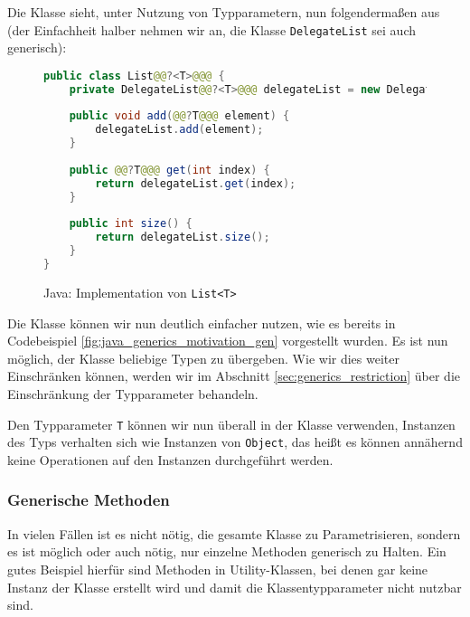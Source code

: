 		Die Klasse sieht, unter Nutzung von Typparametern, nun folgendermaßen aus (der Einfachheit halber nehmen wir an, die Klasse \texttt{DelegateList} sei auch generisch):
		\begin{figure}[H]
			\centering
			\begin{lstlisting}[language = Java, style = base]
public class List@@?<T>@@@ {
	private DelegateList@@?<T>@@@ delegateList = new DelegateList@@?<T>@@@();
	
	public void add(@@?T@@@ element) {
		delegateList.add(element);
	}
	
	public @@?T@@@ get(int index) {
		return delegateList.get(index);
	}
	
	public int size() {
		return delegateList.size();
	}
}
			\end{lstlisting}
			\caption{Java: Implementation von \texttt{List<T>}}
		\end{figure}
		
		Die Klasse können wir nun deutlich einfacher nutzen, wie es bereits in Codebeispiel \ref{fig:java_generics_motivation_gen} vorgestellt wurden. Es ist nun möglich, der Klasse beliebige Typen zu übergeben. Wie wir dies weiter Einschränken können, werden wir im Abschnitt \ref{sec:generics_restriction} über die Einschränkung der Typparameter behandeln.
		
		Den Typparameter \texttt{T} können wir nun überall in der Klasse verwenden, Instanzen des Typs verhalten sich wie Instanzen von \texttt{Object}, das heißt es können annähernd keine Operationen auf den Instanzen durchgeführt werden.
		
		
	
	\subsubsection{Generische Methoden}
		In vielen Fällen ist es nicht nötig, die gesamte Klasse zu Parametrisieren, sondern es ist möglich oder auch nötig, nur einzelne Methoden generisch zu Halten. Ein gutes Beispiel hierfür sind Methoden in Utility-Klassen, bei denen gar keine Instanz der Klasse erstellt wird und damit die Klassentypparameter nicht nutzbar sind.
		
